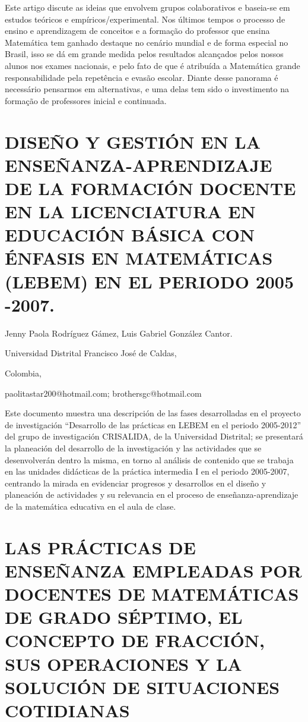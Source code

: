 Este artigo discute as ideias que envolvem grupos colaborativos e
baseia-se em estudos teóricos e empíricos/experimental. Nos últimos
tempos o processo de ensino e aprendizagem de conceitos e a formação
do professor que ensina Matemática tem ganhado destaque no cenário
mundial e de forma especial no Brasil, isso se dá em grande medida
pelos resultados alcançados pelos nossos alunos nos exames nacionais,
e pelo fato de que é atribuída a Matemática grande responsabilidade
pela repetência e evasão escolar. Diante desse panorama é necessário
pensarmos em alternativas, e uma delas tem sido o investimento na
formação de professores inicial e continuada.


\section{DISEÑO Y GESTIÓN EN LA ENSEÑANZA-APRENDIZAJE DE LA FORMACIÓN DOCENTE
EN LA LICENCIATURA EN EDUCACIÓN BÁSICA CON ÉNFASIS EN MATEMÁTICAS
(LEBEM) EN EL PERIODO 2005 -2007. }

\begin{datos}

Jenny Paola Rodríguez Gámez, Luis Gabriel González Cantor.

Universidad Distrital Francisco José de Caldas,

Colombia,

paolitastar200@hotmail.com; brothersgc@hotmail.com 

\end{datos}

Este documento muestra una descripción de las fases desarrolladas
en el proyecto de investigación “Desarrollo de las prácticas en LEBEM
en el periodo 2005-2012” del grupo de investigación CRISALIDA, de
la Universidad Distrital; se presentará la planeación del desarrollo
de la investigación y las actividades que se desenvolverán dentro
la misma, en torno al análisis de contenido que se trabaja en las
unidades didácticas de la práctica intermedia I en el periodo 2005-2007,
centrando la mirada en evidenciar progresos y desarrollos en el diseño
y planeación de actividades y su relevancia en el proceso de enseñanza-aprendizaje
de la matemática educativa en el aula de clase. 


\section{LAS PRÁCTICAS DE ENSEÑANZA EMPLEADAS POR DOCENTES DE MATEMÁTICAS
DE GRADO SÉPTIMO, EL CONCEPTO DE FRACCIÓN, SUS OPERACIONES Y LA SOLUCIÓN
DE SITUACIONES COTIDIANAS}

